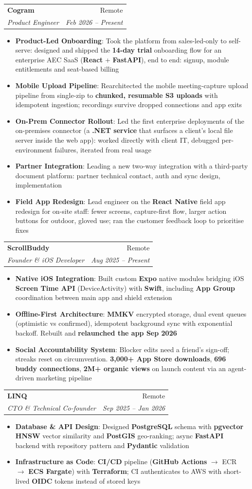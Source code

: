 \documentclass[letterpaper,11pt]{article}
\makeatletter
\newcommand{\resumeItem}[2]{
  \item\small{
    \textbf{#1}{: #2 \vspace{-2pt}}
  }
}
\newcommand{\resumeSubheading}[4]{
  \vspace{-1pt}\item
    \begin{tabular*}{0.97\textwidth}[t]{l@{\extracolsep{\fill}}r}
      \textbf{#1} & #2 \\
      \textit{\small#3} & \textit{\small #4} \\
    \end{tabular*}\vspace{-5pt}
}
\newcommand{\resumeItemListStart}{\begin{itemize}}
\newcommand{\resumeItemListEnd}{\end{itemize}\vspace{-5pt}}
\makeatother
\begin{document}
    \resumeSubheading
      {Cogram}{Remote}
      {Product Engineer}{Feb 2026 -- Present}
      \resumeItemListStart
        \resumeItem{Product-Led Onboarding}
          {Took the platform from sales-led-only to self-serve: designed and shipped the \textbf{14-day trial} onboarding flow for an enterprise AEC SaaS (\textbf{React} + \textbf{FastAPI}), end to end: signup, module entitlements and seat-based billing}
        \resumeItem{Mobile Upload Pipeline}
          {Rearchitected the mobile meeting-capture upload pipeline from single-zip to \textbf{chunked, resumable S3 uploads} with idempotent ingestion; recordings survive dropped connections and app exits}
        \resumeItem{On-Prem Connector Rollout}
          {Led the first enterprise deployments of the on-premises connector (a \textbf{.NET service} that surfaces a client's local file server inside the web app): worked directly with client IT, debugged per-environment failures, iterated from real usage}
        \resumeItem{Partner Integration}
          {Leading a new two-way integration with a third-party document platform: partner technical contact, auth and sync design, implementation}
        \resumeItem{Field App Redesign}
          {Lead engineer on the \textbf{React Native} field app redesign for on-site staff: fewer screens, capture-first flow, larger action buttons for outdoor, gloved use; ran the customer feedback loop to prioritise fixes}
      \resumeItemListEnd

    \resumeSubheading
      {ScrollBuddy}{Remote}
      {Founder \& iOS Developer}{Aug 2025 -- Present}
      \resumeItemListStart
        \resumeItem{Native iOS Integration}
          {Built custom \textbf{Expo} native modules bridging iOS \textbf{Screen Time API} (DeviceActivity) with \textbf{Swift}, including \textbf{App Group} coordination between main app and shield extension}
        \resumeItem{Offline-First Architecture}
          {\textbf{MMKV} encrypted storage, dual event queues (optimistic vs confirmed), idempotent background sync with exponential backoff. Rebuilt and \textbf{relaunched the app Sep 2026}}
        \resumeItem{Social Accountability System}
          {Blocker edits need a friend's sign-off; streaks reset on circumvention. \textbf{3,000+ App Store downloads}, \textbf{696 buddy connections}, \textbf{2M+ organic views} on launch content via an agent-driven marketing pipeline}
      \resumeItemListEnd

    \resumeSubheading
      {LINQ}{Remote}
      {CTO \& Technical Co-founder}{Sep 2025 -- Jan 2026}
      \resumeItemListStart
        \resumeItem{Database \& API Design}
          {Designed \textbf{PostgreSQL} schema with \textbf{pgvector HNSW} vector similarity and \textbf{PostGIS} geo-ranking; async \textbf{FastAPI} backend with repository pattern and \textbf{Pydantic} validation}
        \resumeItem{Infrastructure as Code}
          {\textbf{CI/CD} pipeline (\textbf{GitHub Actions} $\rightarrow$ ECR $\rightarrow$ \textbf{ECS Fargate}) with \textbf{Terraform}; CI authenticates to AWS with short-lived \textbf{OIDC} tokens instead of stored keys}
      \resumeItemListEnd
\end{document}
